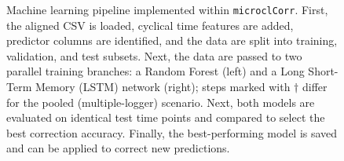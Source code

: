 \documentclass[a4paper, 11pt]{article}
\begin{document}
\begin{figure}[htbp]
\caption{Machine learning pipeline implemented within \texttt{microclCorr}.
  First, the aligned CSV is loaded, cyclical time features are added, predictor
  columns are identified, and the data are split into training, validation, and test subsets.
  Next, the data are passed to two parallel training branches:
  a Random Forest (left) and a Long Short-Term Memory (LSTM) network (right);
  steps marked with $\dagger$ differ for the pooled (multiple-logger) scenario.
  Next, both models are evaluated on identical test time points and compared to select the best correction accuracy.
  Finally, the best-performing model is saved and can be applied to correct new predictions.}
\label{fig:workflow}
\end{figure}
\end{document}
